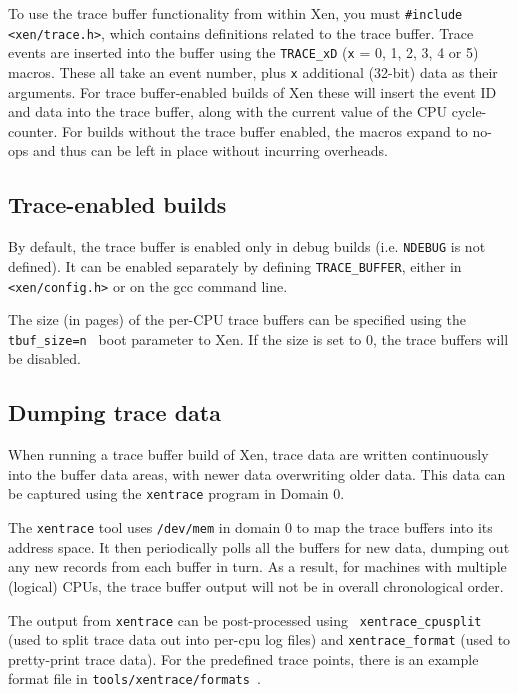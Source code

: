 \documentclass[11pt,twoside,final,openright]{xenstyle}
\begin{document}
To use the trace buffer functionality from within Xen, you must {\tt \#include
<xen/trace.h>}, which contains definitions related to the trace buffer.  Trace
events are inserted into the buffer using the {\tt TRACE\_xD} ({\tt x} = 0, 1,
2, 3, 4 or 5) macros.  These all take an event number, plus {\tt x} additional
(32-bit) data as their arguments.  For trace buffer-enabled builds of Xen these
will insert the event ID and data into the trace buffer, along with the current
value of the CPU cycle-counter.  For builds without the trace buffer enabled,
the macros expand to no-ops and thus can be left in place without incurring
overheads.

\subsection{Trace-enabled builds}

By default, the trace buffer is enabled only in debug builds (i.e. {\tt NDEBUG}
is not defined).  It can be enabled separately by defining {\tt TRACE\_BUFFER},
either in {\tt <xen/config.h>} or on the gcc command line.

The size (in pages) of the per-CPU trace buffers can be specified using the
{\tt tbuf_size=n } boot parameter to Xen.  If the size is set to 0, the trace
buffers will be disabled.

\subsection{Dumping trace data}

When running a trace buffer build of Xen, trace data are written continuously
into the buffer data areas, with newer data overwriting older data.  This data
can be captured using the {\tt xentrace} program in Domain 0.

The {\tt xentrace} tool uses {\tt /dev/mem} in domain 0 to map the trace
buffers into its address space.  It then periodically polls all the buffers for
new data, dumping out any new records from each buffer in turn.  As a result,
for machines with multiple (logical) CPUs, the trace buffer output will not be
in overall chronological order.

The output from {\tt xentrace} can be post-processed using {\tt
xentrace\_cpusplit} (used to split trace data out into per-cpu log files) and
{\tt xentrace\_format} (used to pretty-print trace data).  For the predefined
trace points, there is an example format file in {\tt tools/xentrace/formats }.
\end{document}

